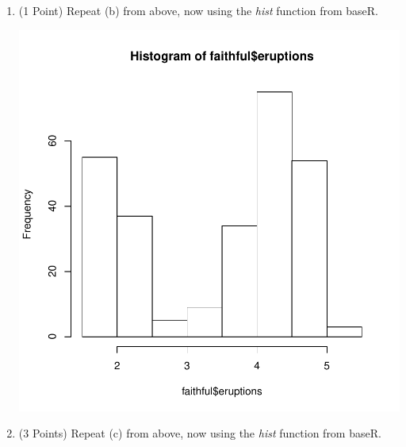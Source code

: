 \documentclass[12pt,letterpaper,final]{article}
\begin{document}
\begin{enumerate}
\begin{enumerate}
\item (1 Point) Repeat (b) from above, now using the {\it hist} function from baseR.

\begin{Schunk}
\end{Schunk}
\includegraphics{rnw_example-004}





\item (3 Points) Repeat (c) from above, now using the {\it hist} function from baseR.


\end{enumerate}
\end{enumerate}
\end{document}
